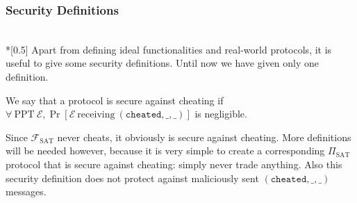 \subsubsection{Security Definitions} \ \\*[0.5\baselineskip]
  Apart from defining ideal functionalities and real-world protocols, it is useful to give
  some security definitions. Until now we have given only one definition.

  \begin{definition}
    We say that a protocol is secure against cheating if $\forall \: \mathrm{PPT} \:
    \mathcal{E}, \Pr\left[\mathcal{E} \: \mathrm{receiving} \: \left(\mathtt{cheated, \_,
    \_}\right)\right]$ is negligible.
  \end{definition}

  Since $\mathcal{F}_{\mathrm{SAT}}$ never cheats, it obviously is secure against
  cheating. More definitions will be needed however, because it is very simple to create a
  corresponding $\Pi_{\mathrm{SAT}}$ protocol that is secure against cheating: simply
  never trade anything. Also this security definition does not protect against maliciously
  sent $(\mathtt{cheated}, \_, \_)$ messages.

